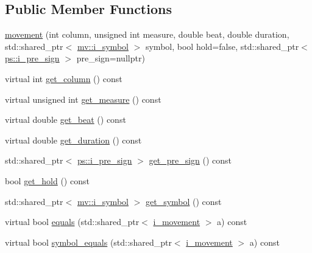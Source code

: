 \subsection*{Public Member Functions}
\begin{DoxyCompactItemize}
\item 
\hyperlink{classmae_1_1fl_1_1laban_1_1movement_a586715bc60b507e4b89b42dd54da8071}{movement} (int column, unsigned int measure, double beat, double duration, std\-::shared\-\_\-ptr$<$ \hyperlink{classmae_1_1fl_1_1laban_1_1mv_1_1i__symbol}{mv\-::i\-\_\-symbol} $>$ symbol, bool hold=false, std\-::shared\-\_\-ptr$<$ \hyperlink{classmae_1_1fl_1_1laban_1_1ps_1_1i__pre__sign}{ps\-::i\-\_\-pre\-\_\-sign} $>$ pre\-\_\-sign=nullptr)
\item 
virtual int \hyperlink{classmae_1_1fl_1_1laban_1_1movement_a7c6e91fd57b5cbec8d5d32901c9897d2}{get\-\_\-column} () const 
\item 
virtual unsigned int \hyperlink{classmae_1_1fl_1_1laban_1_1movement_a30bfe6e9dcfb8d6a26939285f2ff9583}{get\-\_\-measure} () const 
\item 
virtual double \hyperlink{classmae_1_1fl_1_1laban_1_1movement_a8dd1f022fc3402ece07a15863416d80a}{get\-\_\-beat} () const 
\item 
virtual double \hyperlink{classmae_1_1fl_1_1laban_1_1movement_aa1a2354ee3bc32fe218d53631d8c8d29}{get\-\_\-duration} () const 
\item 
std\-::shared\-\_\-ptr$<$ \hyperlink{classmae_1_1fl_1_1laban_1_1ps_1_1i__pre__sign}{ps\-::i\-\_\-pre\-\_\-sign} $>$ \hyperlink{classmae_1_1fl_1_1laban_1_1movement_af4de58bde35d683eaf1adc1d978d2a42}{get\-\_\-pre\-\_\-sign} () const 
\item 
bool \hyperlink{classmae_1_1fl_1_1laban_1_1movement_a51c69b15cef6525751bcd07f0e291688}{get\-\_\-hold} () const 
\item 
std\-::shared\-\_\-ptr$<$ \hyperlink{classmae_1_1fl_1_1laban_1_1mv_1_1i__symbol}{mv\-::i\-\_\-symbol} $>$ \hyperlink{classmae_1_1fl_1_1laban_1_1movement_ac6781745ae4c87fa0a5cfd1566619fee}{get\-\_\-symbol} () const 
\item 
virtual bool \hyperlink{classmae_1_1fl_1_1laban_1_1movement_a93b7f317d4ba358a641b43a21c09f228}{equals} (std\-::shared\-\_\-ptr$<$ \hyperlink{classmae_1_1fl_1_1laban_1_1i__movement}{i\-\_\-movement} $>$ a) const 
\item 
virtual bool \hyperlink{classmae_1_1fl_1_1laban_1_1movement_a6ddca6abc140bfd078473d1be23caf27}{symbol\-\_\-equals} (std\-::shared\-\_\-ptr$<$ \hyperlink{classmae_1_1fl_1_1laban_1_1i__movement}{i\-\_\-movement} $>$ a) const 

\end{DoxyCompactItemize}

